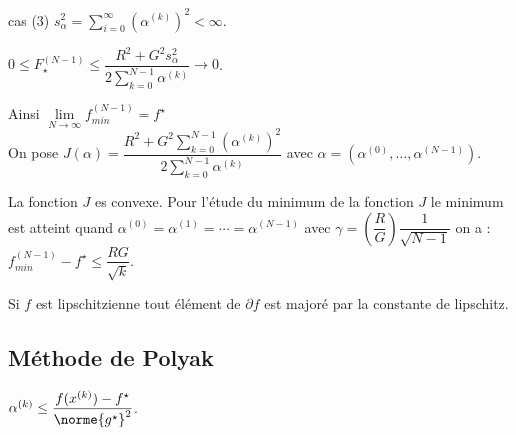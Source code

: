 \documentclass[12pt,a4paper]{article}
\begin{document}
	cas (3) $s_\alpha^2 = \displaystyle\sum_{i=0}^{\infty} (\alpha^{(k)})^2 < \infty$.
	
	$0 \leq F_\star^{(N-1)} \leq \dfrac{R^2+G^2s_\alpha^2}{2\displaystyle\sum_{k=0}^{N-1} \alpha^{(k)}} \to 0$.
	
	Ainsi $\underset{N \to \infty}\lim f_{min}^{(N-1)} = f^{\star}$\\
	
	On pose $J(\alpha) = \dfrac{R^2 + G^2 \displaystyle\sum_{k=0}^{N-1} (\alpha^{(k)})^2}{2\displaystyle\sum_{k=0}^{N-1} \alpha^{(k)}}$ avec $\alpha = (\alpha^{(0)},\ldots,\alpha^{(N-1)})$.
	
	La fonction $J$ es convexe. Pour l'étude du minimum de la fonction $J$ le minimum est atteint quand $\alpha^{(0)} = \alpha^{(1)} = \cdots = \alpha^{(N-1)}$ avec $\gamma = \left(\dfrac RG\right)\dfrac1{\sqrt{N-1}}$ on a :
	$f_ {min}^{(N-1)} - f^\star \leq \dfrac{RG}{\sqrt k}$.
	
	\begin{rmq}
		\begin{minipage}{17cm}
			Si $f$ est lipschitzienne tout élément de $\partial f$ est majoré par la constante de lipschitz.
		\end{minipage}
	\end{rmq}
	
	\subsection{Méthode de Polyak}
	
	$\alpha^{(k)} \leq \dfrac{f(x^{(k)})-f^\star}{\norme{g^\star}^2}$.
\end{document}
